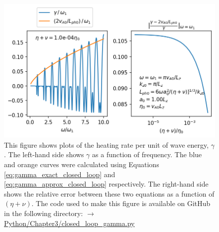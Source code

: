 \begin{figure}
    \vspace{-20pt}
    \centering
    \includegraphics[width=\textwidth,height=0.85\textheight,keepaspectratio]{figures/chapter03/closed_loop_gamma.png}
    \vspace{-30pt}
    \caption{This figure shows plots of the heating rate per unit of wave energy, $\gamma$. The left-hand side shows $\gamma$ as a function of frequency. The blue and orange curves were calculated using Equations \eqref{eq:gamma_exact_closed_loop} and \eqref{eq:gamma_approx_closed_loop} respectively. The right-hand side shows the relative error between these two equations as a function of $(\eta+\nu)$. The code used to make this figure is available on GitHub in the following directory:\newline
    \href{https://github.com/aleksyprok/apkp_thesis/blob/main/Python/Chapter3/closed_loop_gamma.py}{$\rightarrow$ Python/Chapter3/closed\_loop\_gamma.py}}
    \label{fig:closed_loop_gamma}
    \vspace{-10pt}
\end{figure}

